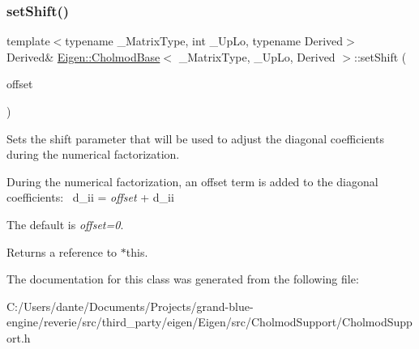 \subsubsection{\texorpdfstring{setShift()}{setShift()}}
{\footnotesize\ttfamily template$<$typename \+\_\+\+Matrix\+Type, int \+\_\+\+Up\+Lo, typename Derived$>$ \\
Derived\& \mbox{\hyperlink{class_eigen_1_1_cholmod_base}{Eigen\+::\+Cholmod\+Base}}$<$ \+\_\+\+Matrix\+Type, \+\_\+\+Up\+Lo, Derived $>$\+::set\+Shift (\begin{DoxyParamCaption}\item[{const Real\+Scalar \&}]{offset }\end{DoxyParamCaption})\hspace{0.3cm}{\ttfamily [inline]}}

Sets the shift parameter that will be used to adjust the diagonal coefficients during the numerical factorization.

During the numerical factorization, an offset term is added to the diagonal coefficients\+:~\newline
{\ttfamily d\+\_\+ii} = {\itshape offset} + {\ttfamily d\+\_\+ii} 

The default is {\itshape offset=0}.

\begin{DoxyReturn}{Returns}
a reference to {\ttfamily $\ast$this}. 
\end{DoxyReturn}


The documentation for this class was generated from the following file\+:\begin{DoxyCompactItemize}
\item 
C\+:/\+Users/dante/\+Documents/\+Projects/grand-\/blue-\/engine/reverie/src/third\+\_\+party/eigen/\+Eigen/src/\+Cholmod\+Support/Cholmod\+Support.\+h\end{DoxyCompactItemize}
